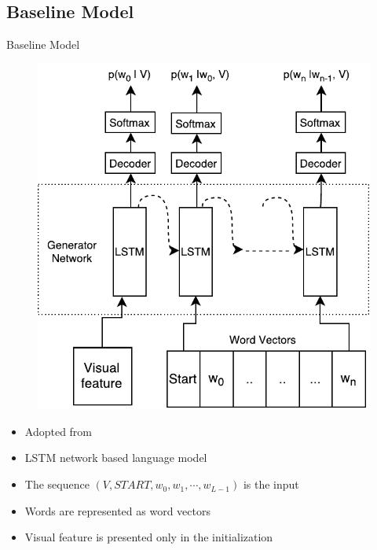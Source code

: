 \documentclass{beamer}
\begin{document}
\subsection{Baseline Model}
\begin{frame}{Baseline Model}
    \begin{figure}[h]
        \centering
        \includegraphics[width=0.4\linewidth]{images/Thesis_lstmLangGen.pdf}
    \end{figure}
    \begin{itemize}
        \item Adopted from~\cite{Vinyals_2015_CVPR} 
        \item LSTM network based language model
        \item The sequence $(V,START,w_0, w_1, \cdots,w_{L-1})$ is the input
        \item Words are represented as word vectors 
        \item Visual feature is presented only in the initialization 
    \end{itemize}
\end{frame}
\end{document}
